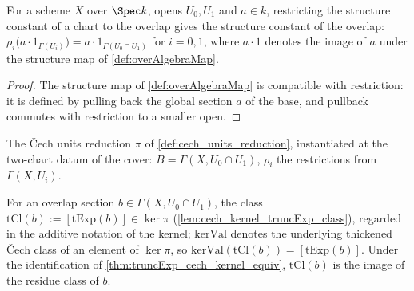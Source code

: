 \begin{lemma}
  \label{lem:resHom_overAlgebraMap}
  \leanok
  For a scheme \(X\) over \(\Spec k\), opens \(U_0, U_1\) and \(a \in k\), restricting
  the structure constant of a chart to the overlap gives the structure constant of the
  overlap: \(\rho_i\bigl(a \cdot 1_{\Gamma(U_i)}\bigr) = a \cdot
  1_{\Gamma(U_0 \cap U_1)}\) for \(i = 0, 1\), where \(a \cdot 1\) denotes the image of
  \(a\) under the structure map of \ref{def:overAlgebraMap}.
\end{lemma}
\begin{proof}
  \leanok
  The structure map of \ref{def:overAlgebraMap} is compatible with restriction: it is
  defined by pulling back the global section \(a\) of the base, and pullback commutes
  with restriction to a smaller open.
\end{proof}

\begin{definition}
  \label{def:twoCover_unitsReduction}
  \leanok
  The \v{C}ech units reduction \(\pi\) of \ref{def:cech_units_reduction}, instantiated
  at the two-chart datum of the cover: \(B = \Gamma(X, U_0 \cap U_1)\),
  \(\rho_i\) the restrictions from \(\Gamma(X, U_i)\).
\end{definition}

\begin{definition}
  \label{def:twoCover_truncExpClass}
  \leanok
  For an overlap section \(b \in \Gamma(X, U_0 \cap U_1)\), the class
  \(\mathrm{tCl}(b) := [\mathrm{tExp}(b)] \in \ker \pi\)
  (\ref{lem:cech_kernel_truncExp_class}), regarded in the additive notation of the
  kernel; \(\mathrm{kerVal}\) denotes the underlying thickened \v{C}ech class of an
  element of \(\ker \pi\), so \(\mathrm{kerVal}(\mathrm{tCl}(b)) =
  [\mathrm{tExp}(b)]\). Under the identification of
  \ref{thm:truncExp_cech_kernel_equiv}, \(\mathrm{tCl}(b)\) is the image of the residue
  class of \(b\).
\end{definition}

